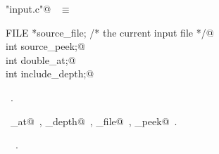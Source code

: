 \documentclass{report}
\begin{document}
\begin{flushleft} \small
\begin{minipage}{\linewidth} \label{scrap137}
\verb@"input.c"@\nobreak\ {\footnotesize {} }$\equiv$
\vspace{-1ex}
\begin{list}{}{} \item
\mbox{}\verb@static FILE *source_file;  /* the current input file */@\\
\mbox{}\verb@static int source_peek;@\\
\mbox{}\verb@static int double_at;@\\
\mbox{}\verb@static int include_depth;@\\
\mbox{}\verb@@{\NWsep}
\end{list}
\vspace{-1ex}
\footnotesize\addtolength{\baselineskip}{-1ex}
\begin{list}{}{\setlength{\itemsep}{-\parsep}\setlength{\itemindent}{-\leftmargin}}
\item \NWtxtFileDefBy\ .
\end{list}
\vspace{-2ex}
\footnotesize\addtolength{\baselineskip}{-1ex}
\begin{list}{}{\setlength{\itemsep}{-\parsep}\setlength{\itemindent}{-\leftmargin}}
\item \NWtxtIdentsDefed\nobreak\  \verb@double_at@\nobreak\ , \verb@include_depth@\nobreak\ , \verb@source_file@\nobreak\ , \verb@source_peek@\nobreak\ .\end{list}
\vspace{-2ex}
\footnotesize\addtolength{\baselineskip}{-1ex}
\begin{list}{}{\setlength{\itemsep}{-\parsep}\setlength{\itemindent}{-\leftmargin}}
\item \NWtxtIdentsUsed\nobreak\  \verb@FILE@\nobreak\ .\end{list}
\end{minipage}\\[4ex]
\end{flushleft}
\end{document}
